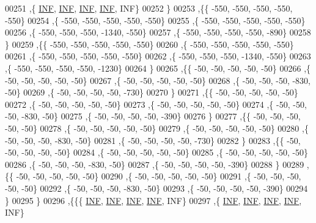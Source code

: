\begin{DoxyCode}
00251   ,\{   \hyperlink{constants_8h_a12c2040f25d8e3a7b9e1c2024c618cb6}{INF},   \hyperlink{constants_8h_a12c2040f25d8e3a7b9e1c2024c618cb6}{INF},   \hyperlink{constants_8h_a12c2040f25d8e3a7b9e1c2024c618cb6}{INF},   \hyperlink{constants_8h_a12c2040f25d8e3a7b9e1c2024c618cb6}{INF},   INF\}
00252   \}
00253  ,\{\{  -550,  -550,  -550,  -550,  -550\}
00254   ,\{  -550,  -550,  -550,  -550,  -550\}
00255   ,\{  -550,  -550,  -550,  -550,  -550\}
00256   ,\{  -550,  -550,  -550, -1340,  -550\}
00257   ,\{  -550,  -550,  -550,  -550,  -890\}
00258   \}
00259  ,\{\{  -550,  -550,  -550,  -550,  -550\}
00260   ,\{  -550,  -550,  -550,  -550,  -550\}
00261   ,\{  -550,  -550,  -550,  -550,  -550\}
00262   ,\{  -550,  -550,  -550, -1340,  -550\}
00263   ,\{  -550,  -550,  -550,  -550, -1230\}
00264   \}
00265  ,\{\{   -50,   -50,   -50,   -50,   -50\}
00266   ,\{   -50,   -50,   -50,   -50,   -50\}
00267   ,\{   -50,   -50,   -50,   -50,   -50\}
00268   ,\{   -50,   -50,   -50,  -830,   -50\}
00269   ,\{   -50,   -50,   -50,   -50,  -730\}
00270   \}
00271  ,\{\{   -50,   -50,   -50,   -50,   -50\}
00272   ,\{   -50,   -50,   -50,   -50,   -50\}
00273   ,\{   -50,   -50,   -50,   -50,   -50\}
00274   ,\{   -50,   -50,   -50,  -830,   -50\}
00275   ,\{   -50,   -50,   -50,   -50,  -390\}
00276   \}
00277  ,\{\{   -50,   -50,   -50,   -50,   -50\}
00278   ,\{   -50,   -50,   -50,   -50,   -50\}
00279   ,\{   -50,   -50,   -50,   -50,   -50\}
00280   ,\{   -50,   -50,   -50,  -830,   -50\}
00281   ,\{   -50,   -50,   -50,   -50,  -730\}
00282   \}
00283  ,\{\{   -50,   -50,   -50,   -50,   -50\}
00284   ,\{   -50,   -50,   -50,   -50,   -50\}
00285   ,\{   -50,   -50,   -50,   -50,   -50\}
00286   ,\{   -50,   -50,   -50,  -830,   -50\}
00287   ,\{   -50,   -50,   -50,   -50,  -390\}
00288   \}
00289  ,\{\{   -50,   -50,   -50,   -50,   -50\}
00290   ,\{   -50,   -50,   -50,   -50,   -50\}
00291   ,\{   -50,   -50,   -50,   -50,   -50\}
00292   ,\{   -50,   -50,   -50,  -830,   -50\}
00293   ,\{   -50,   -50,   -50,   -50,  -390\}
00294   \}
00295  \}
00296 ,\{\{\{   \hyperlink{constants_8h_a12c2040f25d8e3a7b9e1c2024c618cb6}{INF},   \hyperlink{constants_8h_a12c2040f25d8e3a7b9e1c2024c618cb6}{INF},   \hyperlink{constants_8h_a12c2040f25d8e3a7b9e1c2024c618cb6}{INF},   \hyperlink{constants_8h_a12c2040f25d8e3a7b9e1c2024c618cb6}{INF},   INF\}
00297   ,\{   \hyperlink{constants_8h_a12c2040f25d8e3a7b9e1c2024c618cb6}{INF},   \hyperlink{constants_8h_a12c2040f25d8e3a7b9e1c2024c618cb6}{INF},   \hyperlink{constants_8h_a12c2040f25d8e3a7b9e1c2024c618cb6}{INF},   \hyperlink{constants_8h_a12c2040f25d8e3a7b9e1c2024c618cb6}{INF},   INF\}

\end{DoxyCode}
